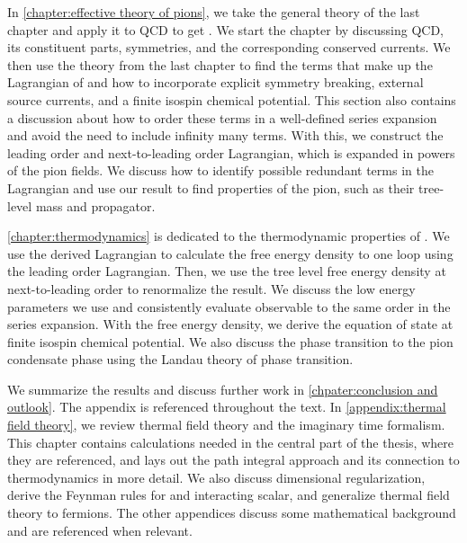 In \autoref{chapter:effective theory of pions}, we take the general theory of the last chapter and apply it to QCD to get \chpt.
We start the chapter by discussing QCD, its constituent parts, symmetries, and the corresponding conserved currents.
We then use the theory from the last chapter to find the terms that make up the Lagrangian of \chpt and how to incorporate explicit symmetry breaking, external source currents, and a finite isospin chemical potential.
This section also contains a discussion about how to order these terms in a well-defined series expansion and avoid the need to include infinity many terms.
With this, we construct the leading order and next-to-leading order Lagrangian, which is expanded in powers of the pion fields.
We discuss how to identify possible redundant terms in the Lagrangian and use our result to find properties of the pion, such as their tree-level mass and propagator.

\cref{chapter:thermodynamics} is dedicated to the thermodynamic properties of \chpt.
We use the derived Lagrangian to calculate the free energy density to one loop using the leading order Lagrangian. 
Then, we use the tree level free energy density at next-to-leading order to renormalize the result.
We discuss the low energy parameters we use and consistently evaluate observable to the same order in the series expansion.
With the free energy density, we derive the equation of state at finite isospin chemical potential.
We also discuss the phase transition to the pion condensate phase using the Landau theory of phase transition.

We summarize the results and discuss further work in \autoref{chpater:conclusion and outlook}.
The appendix is referenced throughout the text.
In \autoref{appendix:thermal field theory}, we review thermal field theory and the imaginary time formalism.
This chapter contains calculations needed in the central part of the thesis, where they are referenced, and lays out the path integral approach and its connection to thermodynamics in more detail.
We also discuss dimensional regularization, derive the Feynman rules for and interacting scalar, and generalize thermal field theory to fermions.
The other appendices discuss some mathematical background and are referenced when relevant.
